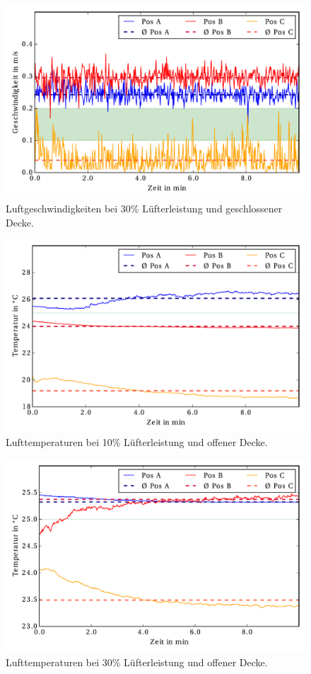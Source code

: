 \begin{figure}[h!tb]
\centering
\includegraphics[scale=.8]{Pictures/AV30pctCC1.pdf}
\caption{Luftgeschwindigkeiten bei 30\% Lüfterleistung und geschlossener Decke.}
\label{fig:30pctCC}
\end{figure}

\begin{figure}[h!tb]
\centering
\includegraphics[scale=.8]{Pictures/AT10pctOC1.pdf}
\caption{Lufttemperaturen bei 10\% Lüfterleistung und offener Decke.}
\label{fig:10pctOC_temp}
\end{figure}


\begin{figure}[h!tb]
\centering
\includegraphics[scale=.8]{Pictures/AT30pctOC1.pdf}
\caption{Lufttemperaturen bei 30\% Lüfterleistung und offener Decke.}
\label{fig:30pctOC_temp}
\end{figure}

